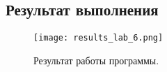 \subsection{Результат выполнения}

\begin{figure}[H]
	\texttt{[image: results\_lab\_6.png]}
	\label{fig:results_lab_6}
	\caption{Результат работы программы.}
\end{figure}
